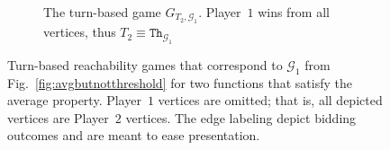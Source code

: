 \documentclass{article}\providecommand{\nequiv}{\not\equiv}\usepackage[a4paper,margin=20mm]{geometry}
\newcommand{\PO}{Player~$1$\xspace}
\newcommand{\PT}{Player~$2$\xspace}
\newcommand{\G}{{\mathcal G}}
\newcommand{\thresh}{\texttt{Th}\xspace}
\newcommand{\zug}[1]{\langle #1  \rangle}
\begin{document}
\begin{figure}[ht]
\begin{subfigure}{0.48\textwidth}
			
			
			
			
			
			
			
		\caption{The turn-based game $G_{T_2, \G_1}$. \PO wins from all vertices, thus $T_2 \equiv \thresh_{\G_1}$}\label{fig:turn-based-T2}
	\end{subfigure}
	\caption{Turn-based reachability games that correspond to \(\G_1\) from Fig.~\ref{fig:avgbutnotthreshold} for two functions that satisfy the average property. \PO vertices are omitted; that is, all depicted vertices are \PT vertices. The edge labeling depict bidding outcomes and are meant to ease presentation.}
	\label{fig:turn-based}
\end{figure}
\end{document}
